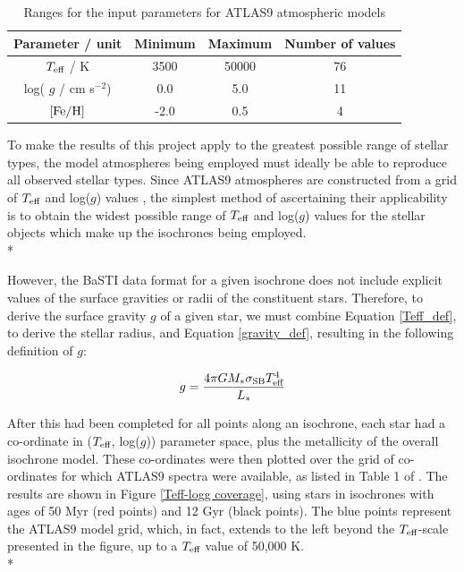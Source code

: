 \documentclass[12pt, a4paper]{report}
\begin{document}
\begin{table}
\begin{center}
\begin{tabular}{cccc}
\hline
Parameter / unit & Minimum & Maximum & Number of values \\
\hline
$T_{\textnormal{eff}}$ / K & 3500 & 50000 & 76 \\
log( $g$ / cm s$^{-2}$) & 0.0 & 5.0 & 11 \\
$\textnormal{[Fe/H]}$ & -2.0 & 0.5 & 4 \\
\hline
\end{tabular}
\caption{Ranges for the input parameters for ATLAS9 atmospheric models}
\label{atlas9_input}
\end{center}
\end{table}

To make the results of this project apply to the greatest possible range of stellar types, the model atmospheres being employed must ideally be able to reproduce all observed stellar types. Since ATLAS9 atmospheres are constructed from a grid of $T_{\textnormal{eff}}$ and log($g$) values \citep{2004astro.ph..5087C}, the simplest method of ascertaining their applicability is to obtain the widest possible range of $T_{\textnormal{eff}}$ and log($g$) values for the stellar objects which make up the isochrones being employed.\\*

However, the BaSTI data format for a given isochrone does not include explicit values of the surface gravities or radii of the constituent stars. Therefore, to derive the surface gravity $g$ of a given star, we must combine Equation \ref{Teff_def}, to derive the stellar radius, and Equation \ref{gravity_def}, resulting in the following definition of $g$:

\begin{equation}
\label{gravity_LT_calc}
g = \frac{4 \pi G M_{*} \sigma_{\textnormal{SB}} T_{\textnormal{eff}}^{4}}{L_{*}}
\end{equation}

After this had been completed for all points along an isochrone, each star had a co-ordinate in ($T_{\textnormal{eff}}$, log($g$)) parameter space, plus the metallicity of the overall isochrone model. These co-ordinates were then plotted over the grid of co-ordinates for which ATLAS9 spectra were available, as listed in Table 1 of \cite{2004astro.ph..5087C}. The results are shown in Figure \ref{Teff-logg coverage}, using stars in isochrones with ages of 50 Myr (red points) and 12 Gyr (black points). The blue points represent the ATLAS9 model grid, which, in fact, extends to the left beyond the $T_{\textnormal{eff}}$-scale presented in the figure, up to a $T_{\textnormal{eff}}$ value of 50,000 K.\\*
\end{document}
